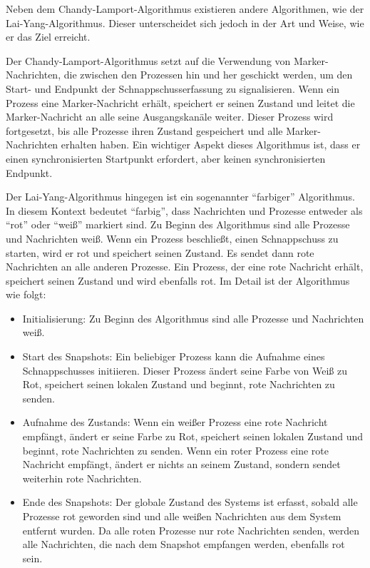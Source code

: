 Neben dem Chandy-Lamport-Algorithmus existieren andere Algorithmen, wie der Lai-Yang-Algorithmus. Dieser unterscheidet sich jedoch in der Art und Weise, wie er das Ziel erreicht.

Der Chandy-Lamport-Algorithmus setzt auf die Verwendung von Marker-Nachrichten, die zwischen den Prozessen hin und her geschickt werden, um den Start- und Endpunkt der Schnappschusserfassung zu signalisieren. Wenn ein Prozess eine Marker-Nachricht erhält, speichert er seinen Zustand und leitet die Marker-Nachricht an alle seine Ausgangskanäle weiter. Dieser Prozess wird fortgesetzt, bis alle Prozesse ihren Zustand gespeichert und alle Marker-Nachrichten erhalten haben. Ein wichtiger Aspekt dieses Algorithmus ist, dass er einen synchronisierten Startpunkt erfordert, aber keinen synchronisierten Endpunkt.

Der Lai-Yang-Algorithmus hingegen ist ein sogenannter \enquote{farbiger} Algorithmus. In diesem Kontext bedeutet \enquote{farbig}, dass Nachrichten und Prozesse entweder als \enquote{rot} oder \enquote{weiß} markiert sind. Zu Beginn des Algorithmus sind alle Prozesse und Nachrichten weiß. Wenn ein Prozess beschließt, einen Schnappschuss zu starten, wird er rot und speichert seinen Zustand. Es sendet dann rote Nachrichten an alle anderen Prozesse. Ein Prozess, der eine rote Nachricht erhält, speichert seinen Zustand und wird ebenfalls rot. 
Im Detail ist der Algorithmus wie folgt:
\begin{itemize}
\item Initialisierung: Zu Beginn des Algorithmus sind alle Prozesse und Nachrichten weiß.
\item Start des Snapshots: Ein beliebiger Prozess kann die Aufnahme eines Schnappschusses initiieren. Dieser Prozess ändert seine Farbe von Weiß zu Rot, speichert seinen lokalen Zustand und beginnt, rote Nachrichten zu senden.
\item Aufnahme des Zustands: Wenn ein weißer Prozess eine rote Nachricht empfängt, ändert er seine Farbe zu Rot, speichert seinen lokalen Zustand und beginnt, rote Nachrichten zu senden. Wenn ein roter Prozess eine rote Nachricht empfängt, ändert er nichts an seinem Zustand, sondern sendet weiterhin rote Nachrichten.
\item Ende des Snapshots: Der globale Zustand des Systems ist erfasst, sobald alle Prozesse rot geworden sind und alle weißen Nachrichten aus dem System entfernt wurden. Da alle roten Prozesse nur rote Nachrichten senden, werden alle Nachrichten, die nach dem Snapshot empfangen werden, ebenfalls rot sein.
\end{itemize}

